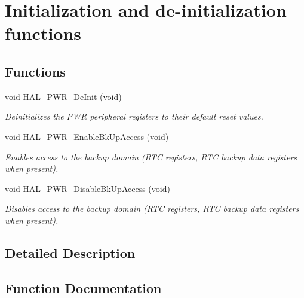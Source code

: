\hypertarget{group___p_w_r___exported___functions___group1}{}\section{Initialization and de-\/initialization functions}
\label{group___p_w_r___exported___functions___group1}
\subsection*{Functions}
\begin{DoxyCompactItemize}
\item 
void \hyperlink{group___p_w_r___exported___functions___group1_ga7edb99b94a46448c34f0301b0a077ff5}{H\+A\+L\+\_\+\+P\+W\+R\+\_\+\+De\+Init} (void)
\begin{DoxyCompactList}\small\item\em Deinitializes the P\+WR peripheral registers to their default reset values. \end{DoxyCompactList}\end{DoxyCompactItemize}
\begin{DoxyCompactItemize}
\item 
void \hyperlink{group___p_w_r___exported___functions___group1_ga3d07cef39bf294db4aed7e06e5dbf9af}{H\+A\+L\+\_\+\+P\+W\+R\+\_\+\+Enable\+Bk\+Up\+Access} (void)
\begin{DoxyCompactList}\small\item\em Enables access to the backup domain (R\+TC registers, R\+TC backup data registers when present). \end{DoxyCompactList}\item 
void \hyperlink{group___p_w_r___exported___functions___group1_ga1513de5f2e4b72e094fb04bab786fec8}{H\+A\+L\+\_\+\+P\+W\+R\+\_\+\+Disable\+Bk\+Up\+Access} (void)
\begin{DoxyCompactList}\small\item\em Disables access to the backup domain (R\+TC registers, R\+TC backup data registers when present). \end{DoxyCompactList}\end{DoxyCompactItemize}


\subsection{Detailed Description}


\subsection{Function Documentation}
\mbox{\label{group___p_w_r___exported___functions___group1_ga7edb99b94a46448c34f0301b0a077ff5}} 
